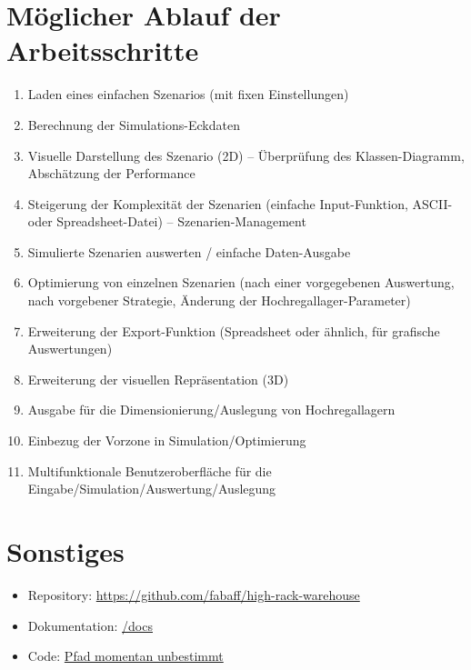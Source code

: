 \documentclass[11pt,a4paper]{article}
\begin{document}
\section{Möglicher Ablauf der Arbeitsschritte}

\begin{enumerate}
  \item Laden eines einfachen Szenarios (mit fixen Einstellungen)
  \item Berechnung der Simulations-Eckdaten
  \item Visuelle Darstellung des Szenario (2D) -- Überprüfung des Klassen-Diagramm, Abschätzung der Performance
  \item Steigerung der Komplexität der Szenarien (einfache Input-Funktion, ASCII- oder Spreadsheet-Datei) -- Szenarien-Management
  \item Simulierte Szenarien auswerten / einfache Daten-Ausgabe
  \item Optimierung von einzelnen Szenarien (nach einer vorgegebenen Auswertung, nach vorgebener Strategie, Änderung der Hochregallager-Parameter)
  \item Erweiterung der Export-Funktion (Spreadsheet oder ähnlich, für grafische Auswertungen)
  \item Erweiterung der visuellen Repräsentation (3D)
  \item Ausgabe für die Dimensionierung/Auslegung von Hochregallagern
  \item Einbezug der Vorzone in Simulation/Optimierung
  \item Multifunktionale Benutzeroberfläche für die Eingabe/Simulation/Auswertung/Auslegung
\end{enumerate}
%
\section{Sonstiges}
\begin{itemize}
  \item Repository: \href{https://github.com/fabaff/high-rack-warehouse}{https://github.com/fabaff/high-rack-warehouse}
  \item Dokumentation: \href{https://github.com/fabaff/high-rack-warehouse/tree/master/docs}{/docs}
  \item Code: \href{https://github.com/fabaff/high-rack-warehouse/}{Pfad momentan unbestimmt}
\end{itemize}
\end{document}
